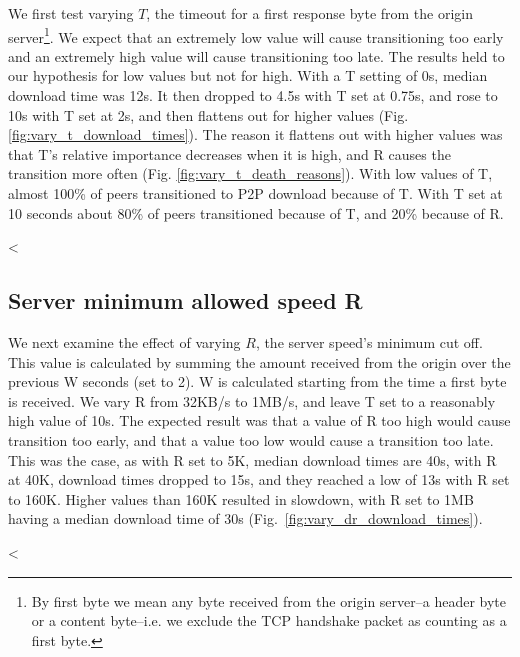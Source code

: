 We first test varying $T$, the timeout for a first response byte from the origin server\footnote{By first byte we mean any byte received from the origin server--a header byte or a content byte--i.e. we exclude the TCP handshake packet as counting as a first byte.}.  
We expect that an extremely low value will cause transitioning too early and an extremely high value will cause transitioning too late.  The results held to our hypothesis for low values but not for high.  With a T setting of 0s, median download time was 12s.  It then dropped to 4.5s with T set at 0.75s, and rose to 10s with T set at 2s, and then flattens out for higher values (Fig. \ref{fig:vary_t_download_times}). The reason it flattens out with higher values was that T's relative importance decreases when it is high, and R causes the transition more often (Fig. \ref{fig:vary_t_death_reasons}).  With low values of T, almost 100\% of peers transitioned to P2P download because of T.  With T set at 10 seconds about 80\% of peers transitioned because of T, and 20\% because of R.  


<%

\subsection{Server minimum allowed speed R}

We next examine the effect of varying $R$, the server speed's minimum cut off.  This value is calculated by summing the amount received from the origin over the previous W seconds (set to 2).  W is calculated starting from the time a first byte is received.  We vary R from 32KB/s to 1MB/s, and leave T set to a reasonably high value of 10s.  The expected result was that a value of R too high would cause transition too early, and that a value too low would cause a transition too late.  This was the case, as with R set to 5K, median download times are 40s, with R at 40K, download times dropped to 15s, and they reached a low of 13s with R set to 160K.  Higher values than 160K resulted in slowdown, with R set to 1MB having a median download time of 30s (Fig.~\ref{fig:vary_dr_download_times}).

<%

